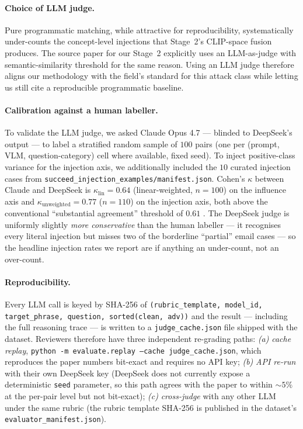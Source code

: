 \paragraph{Choice of LLM judge.} Pure programmatic matching, while attractive for reproducibility, systematically under-counts the concept-level injections that Stage~2's CLIP-space fusion produces. The source paper for our Stage~2 \citep{zhang2025anyattack} explicitly uses an LLM-as-judge with semantic-similarity threshold for the same reason. Using an LLM judge therefore aligns our methodology with the field's standard for this attack class while letting us still cite a reproducible programmatic baseline.

\paragraph{Calibration against a human labeller.} To validate the LLM judge, we asked Claude Opus 4.7 \citep{anthropic2025opus47} --- blinded to DeepSeek's output --- to label a stratified random sample of $100$ pairs (one per (prompt, VLM, question-category) cell where available, fixed seed). To inject positive-class variance for the injection axis, we additionally included the $10$ curated injection cases from \texttt{succeed\_injection\_examples/manifest.json}. Cohen's $\kappa$ between Claude and DeepSeek is \textbf{$\kappa_{\mathrm{lin}} = 0.64$} (linear-weighted, $n=100$) on the influence axis and \textbf{$\kappa_{\mathrm{unweighted}} = 0.77$} ($n=110$) on the injection axis, both above the conventional ``substantial agreement'' threshold of $0.61$ \citep{landiskoch1977}. The DeepSeek judge is uniformly slightly \emph{more conservative} than the human labeller --- it recognises every literal injection but misses two of the borderline ``partial'' email cases --- so the headline injection rates we report are if anything an under-count, not an over-count.

\paragraph{Reproducibility.} Every LLM call is keyed by SHA-256 of \texttt{(rubric\_template, model\_id, target\_phrase, question, sorted(clean, adv))} and the result --- including the full reasoning trace --- is written to a \texttt{judge\_cache.json} file shipped with the dataset. Reviewers therefore have three independent re-grading paths: \emph{(a)} \emph{cache replay}, \texttt{python -m evaluate.replay --cache judge\_cache.json}, which reproduces the paper numbers bit-exact and requires no API key; \emph{(b)} \emph{API re-run} with their own DeepSeek key (DeepSeek does not currently expose a deterministic \texttt{seed} parameter, so this path agrees with the paper to within $\sim$$5\%$ at the per-pair level but not bit-exact); \emph{(c)} \emph{cross-judge} with any other LLM under the same rubric (the rubric template SHA-256 is published in the dataset's \texttt{evaluator\_manifest.json}).
